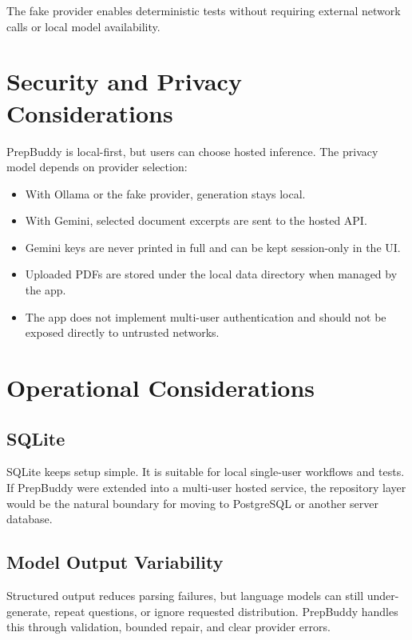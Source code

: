\documentclass[11pt]{article}
\begin{document}
The fake provider enables deterministic tests without requiring external network calls or local model availability.

\section{Security and Privacy Considerations}

PrepBuddy is local-first, but users can choose hosted inference. The privacy model depends on provider selection:

\begin{itemize}
  \item With Ollama or the fake provider, generation stays local.
  \item With Gemini, selected document excerpts are sent to the hosted API.
  \item Gemini keys are never printed in full and can be kept session-only in the UI.
  \item Uploaded PDFs are stored under the local data directory when managed by the app.
  \item The app does not implement multi-user authentication and should not be exposed directly to untrusted networks.
\end{itemize}

\section{Operational Considerations}

\subsection{SQLite}

SQLite keeps setup simple. It is suitable for local single-user workflows and tests. If PrepBuddy were extended into a multi-user hosted service, the repository layer would be the natural boundary for moving to PostgreSQL or another server database.

\subsection{Model Output Variability}

Structured output reduces parsing failures, but language models can still under-generate, repeat questions, or ignore requested distribution. PrepBuddy handles this through validation, bounded repair, and clear provider errors.
\end{document}

